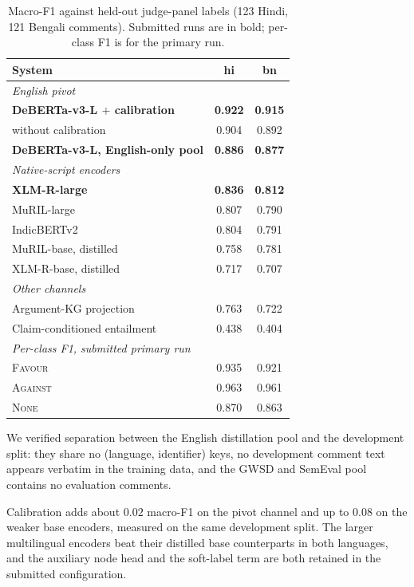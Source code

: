 \documentclass{ceurart}
\begin{document}
\begin{table}[t]
\centering
\caption{Macro-F1 against held-out judge-panel labels (123 Hindi, 121 Bengali
comments). Submitted runs are in bold; per-class F1 is for the primary run.}
\label{tab:main}
\begin{tabular}{lcc}
\toprule
System & hi & bn \\
\midrule
\multicolumn{3}{l}{\emph{English pivot}}\\
\textbf{DeBERTa-v3-L $+$ calibration} & \textbf{0.922} & \textbf{0.915} \\
\quad without calibration & 0.904 & 0.892 \\
\textbf{DeBERTa-v3-L, English-only pool} & \textbf{0.886} & \textbf{0.877} \\
\midrule
\multicolumn{3}{l}{\emph{Native-script encoders}}\\
\textbf{XLM-R-large} & \textbf{0.836} & \textbf{0.812} \\
MuRIL-large & 0.807 & 0.790 \\
IndicBERTv2 & 0.804 & 0.791 \\
MuRIL-base, distilled & 0.758 & 0.781 \\
XLM-R-base, distilled & 0.717 & 0.707 \\
\midrule
\multicolumn{3}{l}{\emph{Other channels}}\\
Argument-KG projection & 0.763 & 0.722 \\
Claim-conditioned entailment & 0.438 & 0.404 \\
\midrule
\multicolumn{3}{l}{\emph{Per-class F1, submitted primary run}}\\
\quad \textsc{Favour} & 0.935 & 0.921 \\
\quad \textsc{Against} & 0.963 & 0.961 \\
\quad \textsc{None} & 0.870 & 0.863 \\
\bottomrule
\end{tabular}
\end{table}

We verified separation between the English distillation pool and the
development split: they share no (language, identifier) keys, no development
comment text appears verbatim in the training data, and the GWSD and SemEval
pool contains no evaluation comments.

Calibration adds about $0.02$ macro-F1 on the pivot channel and up to $0.08$
on the weaker base encoders, measured on the same development split. The
larger multilingual encoders beat their
distilled base counterparts in both languages, and the auxiliary node head and the
soft-label term are both retained in the submitted configuration.
\end{document}
